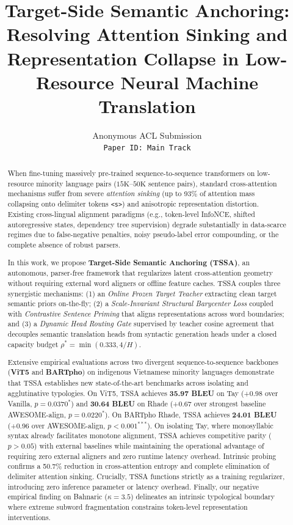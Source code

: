 \documentclass[11pt]{article}
\title{Target-Side Semantic Anchoring: Resolving Attention Sinking and Representation Collapse in Low-Resource Neural Machine Translation}
\author{Anonymous ACL Submission \\
  \texttt{Paper ID: Main Track} \\}
\begin{document}
\maketitle

\begin{abstract}
When fine-tuning massively pre-trained sequence-to-sequence transformers on low-resource minority language pairs ($15\text{K}$--$50\text{K}$ sentence pairs), standard cross-attention mechanisms suffer from severe \textit{attention sinking} (up to 93\% of attention mass collapsing onto delimiter tokens \texttt{<s>}) and anisotropic representation distortion. Existing cross-lingual alignment paradigms (e.g., token-level InfoNCE, shifted autoregressive states, dependency tree supervision) degrade substantially in data-scarce regimes due to false-negative penalties, noisy pseudo-label error compounding, or the complete absence of robust parsers. 

In this work, we propose \textbf{Target-Side Semantic Anchoring (TSSA)}, an autonomous, parser-free framework that regularizes latent cross-attention geometry without requiring external word aligners or offline feature caches. TSSA couples three synergistic mechanisms: (1) an \textit{Online Frozen Target Teacher} extracting clean target semantic priors on-the-fly; (2) a \textit{Scale-Invariant Structural Barycenter Loss} coupled with \textit{Contrastive Sentence Priming} that aligns representations across word boundaries; and (3) a \textit{Dynamic Head Routing Gate} supervised by teacher cosine agreement that decouples semantic translation heads from syntactic generation heads under a closed capacity budget $\rho^* = \min(0.333, 4/H)$. 

Extensive empirical evaluations across two divergent sequence-to-sequence backbones (\textbf{ViT5} and \textbf{BARTpho}) on indigenous Vietnamese minority languages demonstrate that TSSA establishes new state-of-the-art benchmarks across isolating and agglutinative typologies. On ViT5, TSSA achieves \textbf{35.97 BLEU} on Tay (+0.98 over Vanilla, $p = 0.0370^*$) and \textbf{30.64 BLEU} on Rhade (+0.67 over strongest baseline AWESOME-align, $p = 0.0220^*$). On BARTpho Rhade, TSSA achieves \textbf{24.01 BLEU} (+0.96 over AWESOME-align, $p < 0.001^{\ast\ast\ast}$). On isolating Tay, where monosyllabic syntax already facilitates monotone alignment, TSSA achieves competitive parity ($p > 0.05$) with external baselines while maintaining the operational advantage of requiring zero external aligners and zero runtime latency overhead. Intrinsic probing confirms a 50.7\% reduction in cross-attention entropy and complete elimination of delimiter attention sinking. Crucially, TSSA functions strictly as a training regularizer, introducing zero inference parameter or latency overhead. Finally, our negative empirical finding on Bahnaric ($\kappa = 3.5$) delineates an intrinsic typological boundary where extreme subword fragmentation constrains token-level representation interventions.
\end{abstract}
\end{document}
